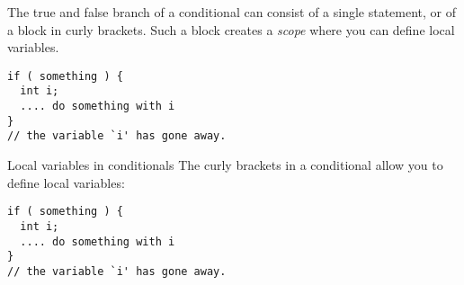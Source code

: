 The true and false branch of a conditional can consist of a single
statement, or of a block in curly brackets. Such a block creates a
%
\emph{scope}
%
where you can define local variables.

\begin{verbatim}
if ( something ) {
  int i; 
  .... do something with i
}
// the variable `i' has gone away.
\end{verbatim}

\begin{slide}{Local variables in conditionals}
  \label{sl:if-scope}
  The curly brackets in a conditional allow you to define local variables:
\begin{verbatim}
if ( something ) {
  int i; 
  .... do something with i
}
// the variable `i' has gone away.
\end{verbatim}
\end{slide}

